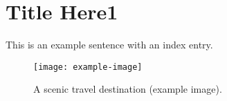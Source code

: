 \newpage
\chapter{Title Here1}
This is an example sentence with an index entry.
\lipsum[1]  %
\begin{figure}[htbp]
  \centering
  \texttt{[image: example-image]} %
  \caption{A scenic travel destination (example image).}
\end{figure}
\lipsum[1]  %
\lipsum[2]  %




